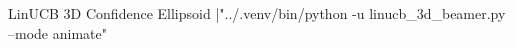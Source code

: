\documentclass{beamer}
\begin{document}
\begin{frame}[fragile]{LinUCB 3D Confidence Ellipsoid}
    \centering
    |"../.venv/bin/python -u linucb_3d_beamer.py --mode animate"
\end{frame}
\end{document}

